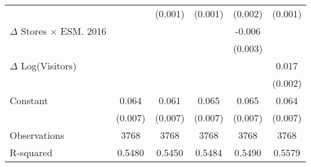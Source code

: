 {\begin{tabular}{l*{5}{c}}
                    &                     &     (0.001)         &     (0.001)         &     (0.002)         &     (0.001)         \\
$\Delta$ Stores $\times$ ESM. 2016&                     &                     &                     &      -0.006\sym{**} &                     \\
                    &                     &                     &                     &     (0.003)         &                     \\
$\Delta$ Log(Visitors)&                     &                     &                     &                     &       0.017\sym{***}\\
                    &                     &                     &                     &                     &     (0.002)         \\
Constant            &       0.064\sym{***}&       0.061\sym{***}&       0.065\sym{***}&       0.065\sym{***}&       0.064\sym{***}\\
                    &     (0.007)         &     (0.007)         &     (0.007)         &     (0.007)         &     (0.007)         \\
\midrule
Observations        &        3768         &        3768         &        3768         &        3768         &        3768         \\
R-squared           &      0.5480         &      0.5450         &      0.5484         &      0.5490         &      0.5579         \\
\bottomrule
\end{tabular}
}
